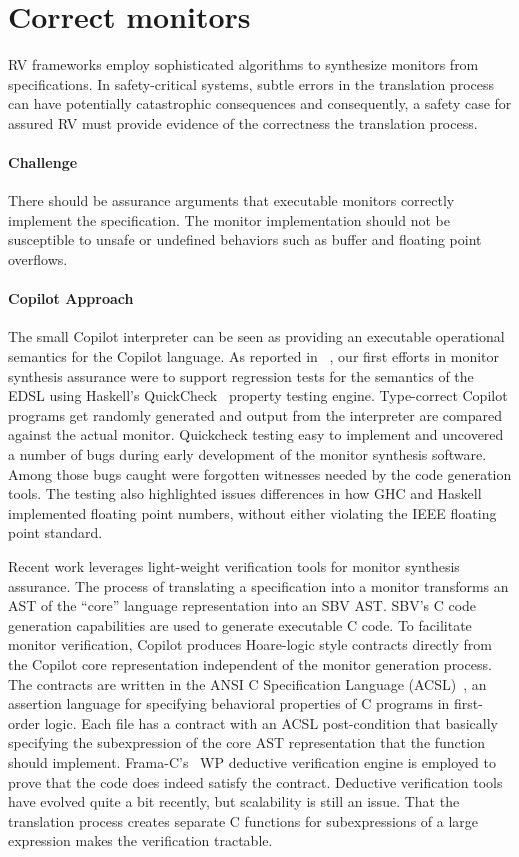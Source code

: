 \section{Correct monitors} \label{sec:codecorrect} 
 RV frameworks employ sophisticated algorithms to synthesize  monitors
 from specifications. In safety-critical systems, subtle errors in the
 translation process can have potentially catastrophic
 consequences and consequently, a safety case for assured RV must
 provide evidence of the correctness the translation process.



\paragraph{Challenge} There should be assurance arguments that
executable monitors correctly implement the specification.  The monitor implementation
should not be susceptible to unsafe or undefined behaviors such as
buffer and floating point overflows. 

\paragraph{Copilot Approach}    
The  small  Copilot interpreter can be seen as providing an executable
operational semantics for the Copilot language.  As reported
in~\cite{pike-icfp-12} , our first efforts in monitor
synthesis assurance were  to support  regression tests for the semantics
of the EDSL using Haskell's QuickCheck~\cite{qc} property testing
engine. Type-correct Copilot programs get randomly generated and
output from the interpreter are compared against the actual
monitor. Quickcheck testing easy to implement and uncovered 
a number of bugs during early development of the monitor synthesis
software. Among those bugs caught were forgotten witnesses needed by
the code generation tools. The testing also highlighted issues
differences in how GHC and Haskell implemented floating point numbers,
without either violating the IEEE floating point standard. 


Recent work  leverages light-weight verification tools for monitor
synthesis assurance.   The process of translating a specification into a monitor
transforms an AST of the ``core'' language representation into an SBV
AST.  SBV's C code generation capabilities are used to generate 
executable C code.  To facilitate monitor verification, Copilot 
produces Hoare-logic style contracts directly from the Copilot core
representation independent of the monitor generation process. The
contracts are written in the ANSI C Specification Language
(ACSL)~\cite{baudin09acsl}, an assertion language for specifying
behavioral properties of C programs in first-order logic.  Each file has a contract  with an ACSL 
post-condition that basically specifying the subexpression of the core
AST representation that the function should  implement. 
Frama-C's~\cite{framac} WP deductive verification engine is employed
to prove that the code does indeed satisfy the contract. Deductive
verification tools have evolved quite a bit recently, but scalability
is still an issue.  That the translation process creates separate C
functions for subexpressions of a large expression makes the
verification tractable. 


